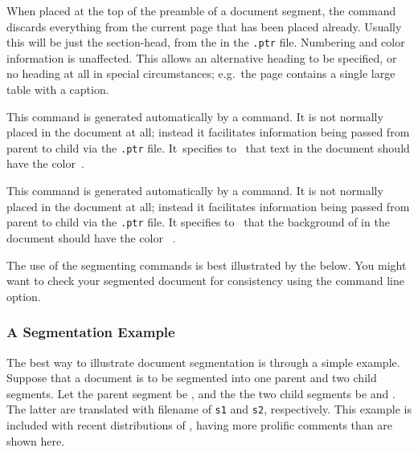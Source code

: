 \begin{htmllist}
%
\item [ \Lc{htmlnohead}\label{htmlnohead}] 
%
When placed at the top of the preamble of a document segment, the 
command discards everything from the current page that has been placed already.
Usually this will be just the section-head, from the  
in the \texttt{.ptr} file. Numbering and color information is unaffected.\html{\\}
This allows an alternative heading to be specified, or no heading at all in special
circumstances; e.g.\ the page contains a single large table with a caption.

%
\item [ \Lc{segmentcolor\char123}\Meta{model}%
 \texttt{\char125\char123}\Meta{color}\texttt{\char125}\label{segcolor}] 
%
This command is generated automatically by a  command. 
It is not normally placed in the document at all; instead it facilitates 
information being passed from parent to child 
via the \texttt{.ptr} file.\html{\\}  
It~specifies to \latextohtml\ that text in the document 
should have the color \,.

%
\item [ \Lc{segmentpagecolor\char123}\Meta{model}%
 \texttt{\char125\char123}\Meta{color}\texttt{\char125}\label{segpagecolor}] 
%
This command is generated automatically by a  command. 
It is not normally placed in the document at all; instead it facilitates 
information being passed from parent to child 
via the \texttt{.ptr} file.\html{\\}
It specifies to \latextohtml\ that the background of in the document 
should have the color ~.%
%
\end{htmllist}

The use of the segmenting commands is best illustrated by the
 below.
You might want to check your segmented document for consistency using
the  command line option.


\subsubsection{A Segmentation Example%
  \label{sec:segmentexample}}%
The best way to illustrate document segmentation 
is through a simple example.  
Suppose that a document is to be segmented into one parent 
and two child segments.  
Let the parent segment be , 
and the the two child segments be  and .  
The latter are translated with filename  of 
\texttt{s1} and \texttt{s2}, respectively.  
This example is included with recent distributions of \latextohtml, 
having more prolific comments than are shown here.

